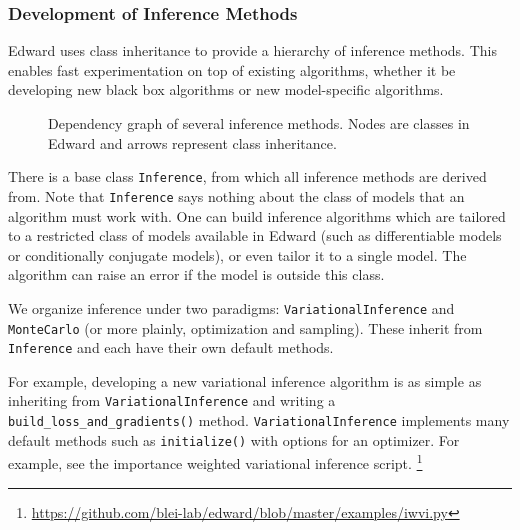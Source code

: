 \subsubsection*{Development of Inference Methods}

Edward uses class inheritance to provide a hierarchy of inference
methods. This enables fast experimentation on top of existing
algorithms, whether it be developing new black box algorithms or
new model-specific algorithms.

\begin{figure}[!htb]
\centering

\caption{Dependency graph of several inference methods. Nodes are classes in Edward
and arrows represent class inheritance.}
\end{figure}

There is a base class \texttt{Inference}, from which all inference
methods are derived from. Note that \texttt{Inference} says nothing
about the class of models that an algorithm must work with. One can
build inference algorithms which are tailored to a restricted class of
models available in Edward (such as differentiable models or
conditionally conjugate models), or even tailor it to a single model.
The algorithm can raise an error if the model is outside this class.

We organize inference under two paradigms:
\texttt{VariationalInference} and \texttt{MonteCarlo} (or more plainly,
optimization and sampling). These inherit from \texttt{Inference} and each
have their own default methods.

For example, developing a new variational inference algorithm is as simple as
inheriting from \texttt{VariationalInference} and writing a
\texttt{build_loss_and_gradients()} method. \texttt{VariationalInference} implements many default methods such
as \texttt{initialize()} with options for an optimizer.
For example, see the
importance weighted variational inference
script.%
\footnote{\url{https://github.com/blei-lab/edward/blob/master/examples/iwvi.py}}
